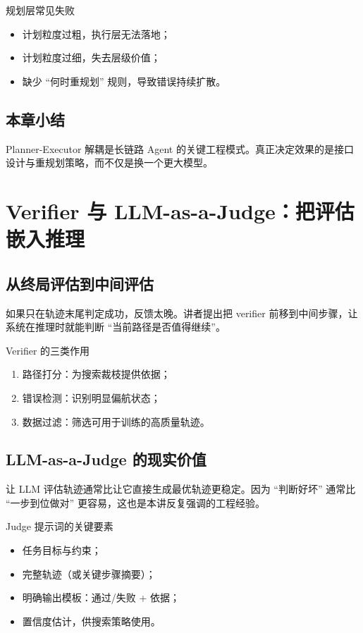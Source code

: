 \documentclass[a4paper]{article}
\begin{document}
\begin{warningbox}{规划层常见失败}
\begin{itemize}
    \item 计划粒度过粗，执行层无法落地；
    \item 计划粒度过细，失去层级价值；
    \item 缺少 ``何时重规划'' 规则，导致错误持续扩散。
\end{itemize}
\end{warningbox}

\subsection{本章小结}
Planner-Executor 解耦是长链路 Agent 的关键工程模式。真正决定效果的是接口设计与重规划策略，而不仅是换一个更大模型。

\section{Verifier 与 LLM-as-a-Judge：把评估嵌入推理}

\subsection{从终局评估到中间评估}
如果只在轨迹末尾判定成功，反馈太晚。讲者提出把 verifier 前移到中间步骤，让系统在推理时就能判断 ``当前路径是否值得继续''。

\begin{importantbox}{Verifier 的三类作用}
\begin{enumerate}
    \item 路径打分：为搜索裁枝提供依据；
    \item 错误检测：识别明显偏航状态；
    \item 数据过滤：筛选可用于训练的高质量轨迹。
\end{enumerate}
\end{importantbox}

\subsection{LLM-as-a-Judge 的现实价值}
让 LLM 评估轨迹通常比让它直接生成最优轨迹更稳定。因为 ``判断好坏'' 通常比 ``一步到位做对'' 更容易，这也是本讲反复强调的工程经验。

\begin{knowledgebox}{Judge 提示词的关键要素}
\begin{itemize}
    \item 任务目标与约束；
    \item 完整轨迹（或关键步骤摘要）；
    \item 明确输出模板：通过/失败 + 依据；
    \item 置信度估计，供搜索策略使用。
\end{itemize}
\end{knowledgebox}
\end{document}
